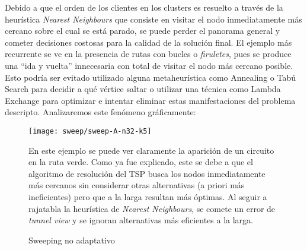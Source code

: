 Debido a que el orden de los clientes en los clusters es resuelto a través de la heurística \textit{Nearest Neighbours} que consiste en visitar el nodo inmediatamente más cercano sobre el cual se está parado, se puede perder el panorama general y cometer decisiones costosas para la calidad de la solución final. El ejemplo más recurrente se ve en la presencia de rutas con bucles o \textit{firuletes}, pues se produce una ``ida y vuelta'' innecesaria con total de visitar el nodo más cercano posible. Esto podría ser evitado utilizado alguna metaheurística como Annealing o Tabú Search para decidir a qué vértice saltar o utilizar una técnica como Lambda Exchange para optimizar e intentar eliminar estas manifestaciones del problema descripto. Analizaremos este fenómeno gráficamente:

\begin{figure}[H]
	\centering
	\begin{minipage}{0.48\textwidth}
		\centering
		\texttt{[image: sweep/sweep-A-n32-k5]}
	\end{minipage}%
	\hspace{0.03\textwidth}
	\begin{minipage}{0.48\textwidth}
    \caption{\footnotesize Sweeping no adaptativo}
		\label{fig:sweep-without-adaptative}
		En este ejemplo se puede ver claramente la aparición de un circuito en la ruta verde. Como ya fue explicado, este se debe a que el algoritmo de resolución del TSP busca los nodos inmediatamente más cercanos sin considerar otras alternativas (a priori más ineficientes) pero que a la larga resultan más óptimas. Al seguir a rajatabla la heurística de \textit{Nearest Neighbours}, se comete un error de \textit{tunnel view} y se ignoran alternativas más eficientes a la larga.
	\end{minipage}%
\end{figure}

